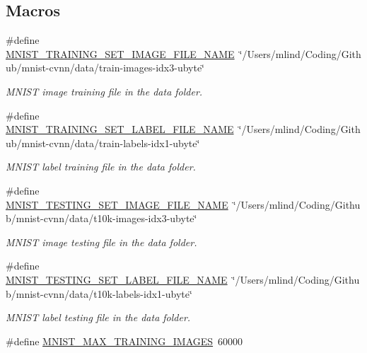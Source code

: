 \subsection*{Macros}
\begin{DoxyCompactItemize}
\item 
\#define \hyperlink{mnist-utils_8h_ad46661079c809c87a6417a2831b1f33a}{M\+N\+I\+S\+T\+\_\+\+T\+R\+A\+I\+N\+I\+N\+G\+\_\+\+S\+E\+T\+\_\+\+I\+M\+A\+G\+E\+\_\+\+F\+I\+L\+E\+\_\+\+N\+A\+M\+E}~\char`\"{}/Users/mlind/Coding/Github/mnist-\/cvnn/data/train-\/images-\/idx3-\/ubyte\char`\"{}
\begin{DoxyCompactList}\small\item\em M\+N\+I\+S\+T image training file in the data folder. \end{DoxyCompactList}\item 
\#define \hyperlink{mnist-utils_8h_a37971d2433c703aebccf946f2cf1a10a}{M\+N\+I\+S\+T\+\_\+\+T\+R\+A\+I\+N\+I\+N\+G\+\_\+\+S\+E\+T\+\_\+\+L\+A\+B\+E\+L\+\_\+\+F\+I\+L\+E\+\_\+\+N\+A\+M\+E}~\char`\"{}/Users/mlind/Coding/Github/mnist-\/cvnn/data/train-\/labels-\/idx1-\/ubyte\char`\"{}
\begin{DoxyCompactList}\small\item\em M\+N\+I\+S\+T label training file in the data folder. \end{DoxyCompactList}\item 
\#define \hyperlink{mnist-utils_8h_ac88cc92111215fbe06eb9918d43f1e00}{M\+N\+I\+S\+T\+\_\+\+T\+E\+S\+T\+I\+N\+G\+\_\+\+S\+E\+T\+\_\+\+I\+M\+A\+G\+E\+\_\+\+F\+I\+L\+E\+\_\+\+N\+A\+M\+E}~\char`\"{}/Users/mlind/Coding/Github/mnist-\/cvnn/data/t10k-\/images-\/idx3-\/ubyte\char`\"{}
\begin{DoxyCompactList}\small\item\em M\+N\+I\+S\+T image testing file in the data folder. \end{DoxyCompactList}\item 
\#define \hyperlink{mnist-utils_8h_ab5fd6cc8cfbb6c18e24e24e046816f50}{M\+N\+I\+S\+T\+\_\+\+T\+E\+S\+T\+I\+N\+G\+\_\+\+S\+E\+T\+\_\+\+L\+A\+B\+E\+L\+\_\+\+F\+I\+L\+E\+\_\+\+N\+A\+M\+E}~\char`\"{}/Users/mlind/Coding/Github/mnist-\/cvnn/data/t10k-\/labels-\/idx1-\/ubyte\char`\"{}
\begin{DoxyCompactList}\small\item\em M\+N\+I\+S\+T label testing file in the data folder. \end{DoxyCompactList}\item 
\#define \hyperlink{mnist-utils_8h_a0ea148c64cbba94b2d074a069acfd121}{M\+N\+I\+S\+T\+\_\+\+M\+A\+X\+\_\+\+T\+R\+A\+I\+N\+I\+N\+G\+\_\+\+I\+M\+A\+G\+E\+S}~60000

\end{DoxyCompactItemize}
